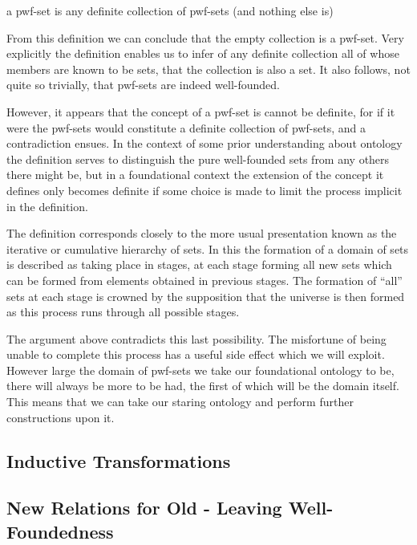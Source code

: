 \documentclass[numreferences]{rbjk}
\begin{document}
\begin{article}

\begin{centering}
a pwf-set is any definite collection of pwf-sets (and nothing else is)
\end{centering}

From this definition we can conclude that the empty collection is a pwf-set.
Very explicitly the definition enables us to infer of any definite collection all of whose members are known to be sets, that the collection is also a set.
It also follows, not quite so trivially, that pwf-sets are indeed well-founded.

However, it appears that the concept of a pwf-set is cannot be definite, for if it were the pwf-sets would constitute a definite collection of pwf-sets, and a contradiction ensues.
In the context of some prior understanding about ontology the definition serves to distinguish the pure well-founded sets from any others there might be, but in a foundational context the extension of the concept it defines only becomes definite if some choice is made to limit the process implicit in the definition.

The definition corresponds closely to the more usual presentation known as the iterative or cumulative hierarchy of sets.
In this the formation of a domain of sets is described as taking place in stages, at each stage forming all new sets which can be formed from elements obtained in previous stages.
The formation of ``all'' sets at each stage is crowned by the supposition that the universe is then formed as this process runs through all possible stages.

The argument above contradicts this last possibility.
The misfortune of being unable to complete this process has a useful side effect which we will exploit.
However large the domain of pwf-sets we take our foundational ontology to be, there will always be more to be had, the first of which will be the domain itself.
This means that we can take our staring ontology and perform further constructions upon it.

\subsection{Inductive Transformations}

\subsection{New Relations for Old - Leaving Well-Foundedness}


\end{article}
\end{document}
